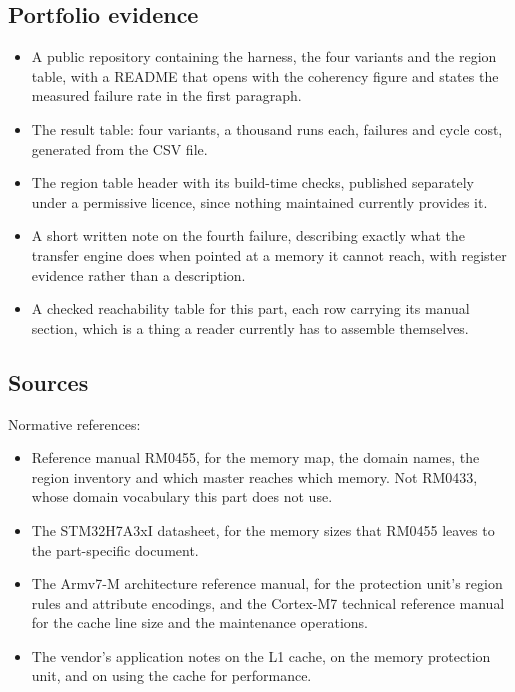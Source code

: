 \subsection*{Portfolio evidence}

\begin{itemize}
\item A public repository containing the harness, the four variants and the
region table, with a README that opens with the coherency figure and states the
measured failure rate in the first paragraph.
\item The result table: four variants, a thousand runs each, failures and cycle
cost, generated from the CSV file.
\item The region table header with its build-time checks, published separately
under a permissive licence, since nothing maintained currently provides it.
\item A short written note on the fourth failure, describing exactly what the
transfer engine does when pointed at a memory it cannot reach, with register
evidence rather than a description.
\item A checked reachability table for this part, each row carrying its manual
section, which is a thing a reader currently has to assemble themselves.
\end{itemize}

\subsection*{Sources}

Normative references:
\begin{itemize}
\item Reference manual RM0455, for the memory map, the domain names, the region
inventory and which master reaches which memory. Not RM0433, whose domain
vocabulary this part does not use.
\item The STM32H7A3xI datasheet, for the memory sizes that RM0455 leaves to the
part-specific document.
\item The Armv7-M architecture reference manual, for the protection unit's
region rules and attribute encodings, and the Cortex-M7 technical reference
manual for the cache line size and the maintenance operations.
\item The vendor's application notes on the L1 cache, on the memory protection
unit, and on using the cache for performance.
\end{itemize}

